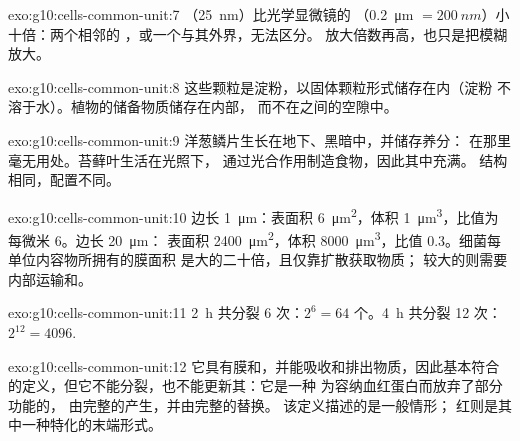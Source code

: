 \begin{solution}{exo:g10:cells-common-unit:7}
（\qty{25}{nm}）比光学显微镜的
（\qty{0.2}{\micro m} $= \qty{200}{nm}$）小十倍：两个相邻的
，或一个与其外界，无法区分。
放大倍数再高，也只是把模糊放大。
\end{solution}

\begin{solution}{exo:g10:cells-common-unit:8}
这些颗粒是淀粉，以固体颗粒形式储存在内（淀粉
不溶于水）。植物的储备物质储存在内部，
而不在之间的空隙中。
\end{solution}

\begin{solution}{exo:g10:cells-common-unit:9}
洋葱鳞片生长在地下、黑暗中，并储存养分：
在那里毫无用处。苔藓叶生活在光照下，
通过光合作用制造食物，因此其中充满。
结构相同，配置不同。
\end{solution}

\begin{solution}{exo:g10:cells-common-unit:10}
边长 \qty{1}{\micro m}：表面积 \qty{6}{\micro m^2}，体积
\qty{1}{\micro m^3}，比值为每微米 6。边长 \qty{20}{\micro m}：
表面积 \qty{2400}{\micro m^2}，体积 \qty{8000}{\micro m^3}，比值
0.3。细菌每单位内容物所拥有的膜面积
是大的二十倍，且仅靠扩散获取物质；
较大的则需要内部运输和。
\end{solution}

\begin{solution}{exo:g10:cells-common-unit:11}
\qty{2}{h} 共分裂 6 次：$2^6 = 64$ 个。\qty{4}{h} 共分裂 12 次：
$2^{12} = 4096$.
\end{solution}

\begin{solution}{exo:g10:cells-common-unit:12}
它具有膜和，并能吸收和排出物质，因此基本符合
的定义，但它不能分裂，也不能更新其：它是一种
为容纳血红蛋白而放弃了部分功能的，
由完整的产生，并由完整的替换。
该定义描述的是一般情形；
红则是其中一种特化的末端形式。
\end{solution}

